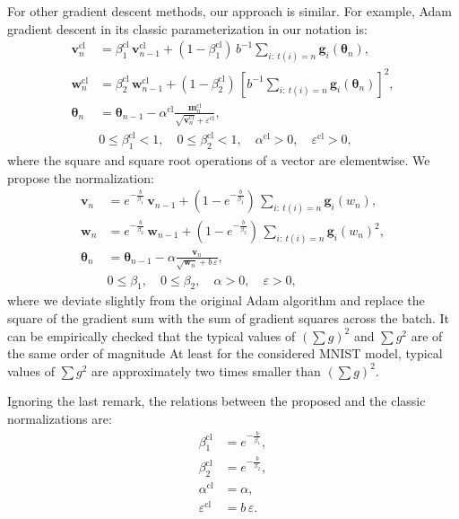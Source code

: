\documentclass[12pt,a4paper]{amsart}
\numberwithin{equation}{section}
\theoremstyle{remark}
\begin{document}
For other gradient descent methods,
our approach is similar.
For example, Adam gradient descent in its classic parameterization in our notation is:
\begin{equation}
	\begin{aligned}
		\mathbf{v}^{\text{cl}}_n
			&= \beta_1^{\text{cl}}\, \mathbf{v}^{\text{cl}}_{n-1}
			+ (1 - \beta_1^{\text{cl}})\, b^{-1} \sum_{i:~ t(i) = n} \mathbf{g}_i(\boldsymbol\theta_n), \\
		\mathbf{w}^{\text{cl}}_n
			&= \beta_2^{\text{cl}}\, \mathbf{w}^{\text{cl}}_{n-1}
			+ (1 - \beta_2^{\text{cl}})\,
				\left[
					b^{-1} \sum_{i:~ t(i) = n} \mathbf{g}_i(\boldsymbol\theta_n)
				\right]^2, \\
		\boldsymbol\theta_n &=
			\boldsymbol\theta_{n-1} - \alpha^{\text{cl}} \frac
				{\mathbf{m}^{\text{cl}}_n}
				{\sqrt{\mathbf{v}^{\text{cl}}_n} + \varepsilon^{\text{cl}}}, \\
		&0 \leq \beta_1^{\text{cl}} <1, \quad
		0 \leq \beta_2^{\text{cl}} <1, \quad
		\alpha^{\text{cl}} > 0, \quad
		\varepsilon^{\text{cl}} > 0,
	\end{aligned}
	\label{Formula: Adam SGD}
\end{equation}
where the square and square root operations of a vector are elementwise.
We propose the normalization:
\[\begin{aligned}
	\mathbf{v}_n
		&= e^{-\frac{b}{\beta_1}}\, \mathbf{v}_{n-1}
		+ (1 - e^{-\frac{b}{\beta_1}})\, \sum_{i:~ t(i) = n} \mathbf{g}_i(w_n), \\
	\mathbf{w}_n
		&= e^{-\frac{b}{\beta_2}}\, \mathbf{w}_{n-1}
		+ (1 - e^{-\frac{b}{\beta_2}})\,
			\sum_{i:~ t(i) = n} \mathbf{g}_i(w_n)^2, \\
	\boldsymbol\theta_n &=
		\boldsymbol\theta_{n-1} - \alpha \frac
			{\mathbf{v}_n}
			{\sqrt{\mathbf{w}_n} + b\, \varepsilon}, \\
	& 0 \leq \beta_1, \quad
	0 \leq \beta_2, \quad
	\alpha > 0, \quad
	\varepsilon > 0,
\end{aligned}\]
where we deviate slightly from the original Adam algorithm
and replace the square of the gradient sum with the sum of gradient squares across the batch.
It can be empirically checked that the typical values of
$(\sum g)^2$
and
$\sum g^2$
are of the same order of magnitude
At least for the considered MNIST model, typical values of
$\sum g^2$
are approximately two times smaller than
$(\sum g)^2$.

Ignoring the last remark, the relations between the proposed and the classic normalizations are:
\begin{equation}
	\begin{aligned}
		\beta_1^{\text{cl}} &= e^{-\frac{b}{\beta_1}}, \\
		\beta_2^{\text{cl}} &= e^{-\frac{b}{\beta_2}}, \\
		\alpha^{\text{cl}} &= \alpha, \\
		\varepsilon^{\text{cl}} &= b\,\varepsilon.
	\end{aligned}
	\label{Formula: Adam hyperparameter relation}
\end{equation}
\end{document}

